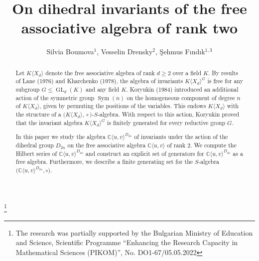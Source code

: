 \documentclass{amsart}[12pt]
\theoremstyle{definition}
\DeclareMathOperator{\Sym}{Sym}
\DeclareMathOperator{\GL}{GL}
\newcommand{\C}{{\mathbb{C}}}
\newcommand{\action}{\!\circ}
\newcommand{\KXd}{K\langle X_d\rangle}
\newcommand{\KSS}{\big(\KXd,\action\big)}
\newcommand{\Cuv}{\C \langle u,v\rangle}
\newcommand{\CuvD}{{\mathbb C}\langle u,v\rangle^{D_{2n}}}
\newcommand{\Dn}{D_{2n}}
\newcommand{\CuvDc}{\big(\C\langle u,v\rangle^{D_{2n}},\circ\big )}
\begin{document}

\title[On dihedral invariants of the free associative algebra of rank two]
{On dihedral invariants of the free associative algebra of rank two}

\author[Silvia Boumova, Vesselin Drensky, {\c S}ehmus F{\i}nd{\i}k]
{Silvia Boumova$^{1}$, Vesselin Drensky$^{2}$, {\c S}ehmus F{\i}nd{\i}k$^{1,3}$}
\address{$^{1}$Faculty of Mathematics and Informatics,
Sofia University, Sofia, Bulgaria and Institute of Mathematics and Informatics,
Bulgarian Academy of Sciences,
1113 Sofia, Bulgaria\\}
\address{$^{2}$Institute of Mathematics and Informatics,
Bulgarian Academy of Sciences,
1113 Sofia, Bulgaria}
\address{$^{3}$Department of Mathematics,
\c{C}ukurova University, 01330 Balcal\i,
 Adana, Turkey\\}


\thanks
{The research was partially supported by the Bulgarian Ministry of Education and Science, Scientific Programme ``Enhancing the
Research Capacity in Mathematical Sciences (PIKOM)'', No. DO1-67/05.05.2022}


\begin{abstract}

Let $\KXd$ denote the free associative algebra of rank $d \geq 2$ over a field $K$. By results of Lane (1976) and Kharchenko (1978),
the algebra of invariants $\KXd^G$ is free for any subgroup $G \leq \GL_d(K)$ and any field $K$.
Koryukin (1984) introduced an additional action of the symmetric group $\Sym(n)$ on the homogeneous component of degree $n$ of $\KXd$,
given by permuting the positions of the variables. This endows $\KXd$ with the structure of a $\KSS$-$S$-algebra.
With respect to this action, Koryukin proved that the invariant algebra $\KXd^G$ is finitely generated for every reductive group $G$.

In this paper we study the algebra $\CuvD$ of invariants under the action of the dihedral group $\Dn$ on the free associative algebra $\Cuv$ of rank $2$.
We compute the Hilbert series of $\CuvD$ and construct an explicit set of generators for $\CuvD$ as a free algebra.
Furthermore, we describe a finite generating set for the $S$-algebra $\CuvDc$.
\end{abstract}
\end{document}
